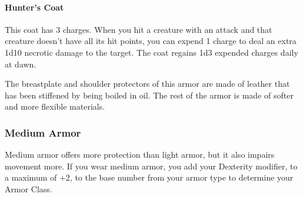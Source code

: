     \paragraph{Hunter's Coat}
        This coat has 3 charges.
        When you hit a creature with an attack and that creature doesn't have all its hit points, you can expend 1 charge to deal an extra 1d10 necrotic damage to the target.
        The coat regains 1d3 expended charges daily at dawn.

        The breastplate and shoulder protectors of this armor are made of leather that has been stiffened by being boiled in oil.
        The rest of the armor is made of softer and more flexible materials.
\newpage
\subsubsection{Medium Armor} \label{ssec::mediumarmor}
    Medium armor offers more protection than light armor, but it also impairs movement more.
    If you wear medium armor, you add your Dexterity modifier, to a maximum of +2, to the base number from your armor type to determine your Armor Class.

